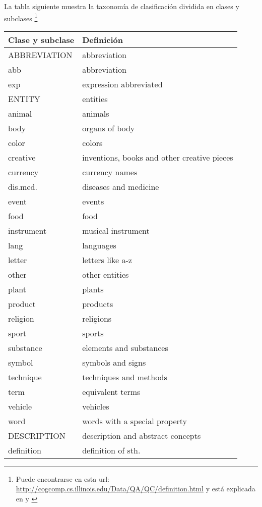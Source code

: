 La tabla siguiente muestra la taxonomía de clasificación dividida en clases y subclases \footnote{Puede encontrarse en esta url: \url{http://cogcomp.cs.illinois.edu/Data/QA/QC/definition.html} y está explicada en \cite{QC2} y \cite{QC3}}


\begin{center}
\begin{longtable}{| l | l |}
\hline
Clase y subclase & Definición \\ \hline
ABBREVIATION &  abbreviation \\ \hline
  abb & abbreviation\\ \hline
  exp & expression abbreviated\\ \hline
ENTITY  & entities\\ \hline
  animal  & animals\\ \hline
  body & organs of body\\ \hline
  color & colors\\ \hline
  creative & inventions, books and other creative pieces\\ \hline
  currency & currency names\\ \hline
  dis.med. & diseases and medicine\\ \hline
  event & events\\ \hline
  food & food\\ \hline
  instrument & musical instrument\\ \hline
  lang & languages\\ \hline
  letter & letters like a-z\\ \hline
  other & other entities\\ \hline
  plant & plants\\ \hline
  product & products\\ \hline
  religion  & religions\\ \hline
  sport & sports\\ \hline
  substance & elements and substances\\ \hline
  symbol & symbols and signs\\ \hline
  technique & techniques and methods\\ \hline
  term  & equivalent terms\\ \hline
  vehicle & vehicles\\ \hline
  word & words with a special property\\ \hline
DESCRIPTION & description and abstract concepts\\ \hline
  definition & definition of sth.\\ \hline

\end{longtable}
\end{center}
